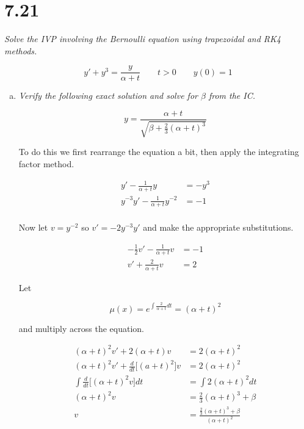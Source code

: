 \documentclass{article}
\begin{document}
\section*{7.21  \normalsize}

\textit{Solve the IVP involving the Bernoulli equation using trapezoidal and RK4 methods.}

$$y' + y^3 = \frac{y}{\alpha+t} \qquad t > 0 \qquad y(0) = 1$$

\begin{enumerate}[(a)]
  \item \textit{Verify the following exact solution and solve for $\beta$ from the IC.}

    $$y = \frac{\alpha + t}{\sqrt{\beta + \frac{2}{3}(\alpha + t)^3}}$$

    To do this we first rearrange the equation a bit, then apply the integrating factor method.

    \begin{align*}
      y' - \frac{1}{\alpha + t}y &= -y^3 \\
      y^{-3}y' - \frac{1}{\alpha + t}y^{-2} &= -1 \\
    \end{align*}
    
    Now let $v = y^{-2}$ so $v' = -2y^{-3}y'$ and make the appropriate substitutions.

    \begin{align*}
      -\frac{1}{2}v' - \frac{1}{\alpha + t}v &= -1 \\
      v' + \frac{2}{\alpha + t}v &= 2
    \end{align*}

    Let 

    $$\mu(x) = e^{\int\frac{2}{\alpha+t}dt} = (\alpha + t)^2$$

    and multiply across the equation.

    \begin{align*}
      (\alpha + t)^2v' + 2(\alpha + t)v &= 2(\alpha + t)^2 \\
      (\alpha + t)^2v' + \frac{d}{dt}\big[(a+t)^2\big]v &= 2(\alpha + t)^2 \\
      \int\frac{d}{dt}\big[(\alpha + t)^2v]dt &= \int2(\alpha + t)^2dt \\
      (\alpha + t)^2v &= \frac{2}{3}(\alpha + t)^3 + \beta \\
      v &= \frac{\frac{2}{3}(\alpha + t)^3 + \beta}{(\alpha + t)^2} \\
    \end{align*}


\end{enumerate}
\end{document}
